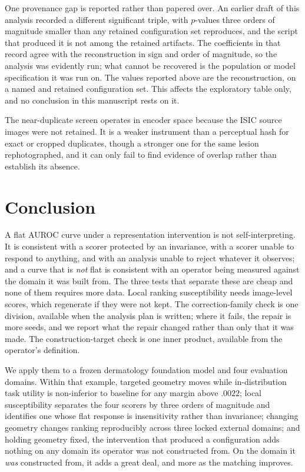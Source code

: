 \documentclass[11pt,a4paper]{article}
\begin{document}
One provenance gap is reported rather than papered over. An earlier draft of this analysis recorded a different significant triple, with $p$-values three orders of magnitude smaller than any retained configuration set reproduces, and the script that produced it is not among the retained artifacts. The coefficients in that record agree with the reconstruction in sign and order of magnitude, so the analysis was evidently run; what cannot be recovered is the population or model specification it was run on. The values reported above are the reconstruction, on a named and retained configuration set. This affects the exploratory table only, and no conclusion in this manuscript rests on it.

The near-duplicate screen operates in encoder space because the ISIC source images were not retained. It is a weaker instrument than a perceptual hash for exact or cropped duplicates, though a stronger one for the same lesion rephotographed, and it can only fail to find evidence of overlap rather than establish its absence.

\section{Conclusion}
A flat AUROC curve under a representation intervention is not self-interpreting.
It is consistent with a scorer protected by an invariance, with a scorer unable
to respond to anything, and with an analysis unable to reject whatever it
observes; and a curve that is \emph{not} flat is consistent with an operator
being measured against the domain it was built from. The three tests that
separate these are cheap and none of them requires more data. Local ranking
susceptibility needs image-level scores, which regenerate if they were not
kept. The correction-family check is one division, available when the analysis
plan is written; where it fails, the repair is more seeds, and we report what
the repair changed rather than only that it was made. The construction-target check is one inner product, available
from the operator's definition.

We apply them to a frozen dermatology foundation model and four evaluation
domains. Within that example, targeted geometry moves while in-distribution
task utility is non-inferior to baseline for any margin above $.0022$; local
susceptibility separates the four scorers by three orders of magnitude and
identifies one whose flat response is insensitivity rather than invariance;
changing geometry changes ranking reproducibly across three locked external
domains; and holding geometry fixed, the intervention that produced a
configuration adds nothing on any domain its operator was not constructed from.
On the domain it \emph{was} constructed from, it adds a great deal, and more as
the matching improves.
\end{document}
